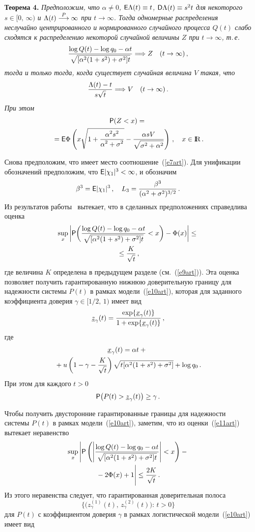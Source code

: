 \begin{multicols}{2}
\smallskip

\noindent
{\textbf{Теорема 4.}} {\it Предположим, что $\alpha\neq 0$, ${\sf
E}\Lambda(t) \equiv t$,  ${\sf D}\Lambda(t)\equiv s^2t$ для
некоторого $s\in[0,\, \infty)$ и $\Lambda(t)\stackrel{P}{\longrightarrow}\infty$ при $t\to\infty$.
Тогда одномерные распределения неслучайно центрированного и
нормированного случайного процесса $Q(t)$ слабо сходятся к
распределению некоторой случайной величины $Z$ при $t\to\infty$,
т.\,е.\
$$
\displaystyle\frac{\displaystyle \log Q(t)-\log q_0-\alpha
t\mathstrut}{\displaystyle \sqrt{[\alpha^2(1+s^2)+\sigma^2]t}\mathstrut}\Longrightarrow Z\ \ \
(t\to\infty)\,,
$$
тогда и только тогда, когда существует случайная величина $V$
такая, что
$$
\displaystyle\frac{\displaystyle \Lambda(t)-t\mathstrut}{\displaystyle s\sqrt t\mathstrut}\Longrightarrow V\ \ \ (t\to\infty)\,.
$$
При этом}
\begin{multline*}
{\sf P}(Z<x)={}\\
{}={\sf
E}\Phi\left(x\sqrt{1+\displaystyle\frac{\displaystyle \alpha^2s^2\mathstrut}{\displaystyle \alpha^2+\sigma^2\mathstrut}}-\displaystyle\frac{\displaystyle \alpha
sV\mathstrut}{\displaystyle \sqrt{\sigma^2+\alpha^2}\mathstrut}\right)\,,\ \ \ x\in{\rm I\hspace{-0.7mm}\rm R}\,.
\end{multline*}

\smallskip

Снова предположим, что имеет место соотношение~(\ref{e7art}). Для унификации
обозначений предположим, что ${\sf E}|\chi_1|^3<\infty$, и обозначим
$$
\beta^3 = {\sf E}|\chi_1|^3\,,\ \ \ L_3 =
\frac{\beta^3}{(\alpha^2+\sigma^2)^{3/2}}\,.
$$
Из результатов работы~\cite{10art} вытекает, что в сделанных
предположениях справедлива оценка
\begin{multline}
\sup_x\bigg|{\sf P}\bigg(\displaystyle\frac{\displaystyle \log Q(t)-\log q_0-\alpha
t\mathstrut}{\displaystyle \sqrt{[\alpha^2(1+s^2)+\sigma^2]t}\mathstrut}<x\bigg)-\Phi(x)\bigg|\le{}\\
{}\le \displaystyle\frac{\displaystyle K\mathstrut}{\displaystyle \sqrt{t}\mathstrut}\,,
\label{e11art}
\end{multline}
где величина $K$ определена в предыдущем разделе (см.~(\ref{e9art})). Эта
оценка позволяет получить гарантированную нижнюю доверительную
границу для надежности системы $P(t)$ в рамках модели~(\ref{e10art}),
которая для заданного коэффициента доверия $\gamma\in[1/2,\,1)$
имеет вид
$$
\underline z_{\gamma}(t)=\displaystyle\frac{\displaystyle \exp\{\underline
x_{\gamma}(t)\}\mathstrut}{\displaystyle 1+\exp\{\underline x_{\gamma}(t)\}\mathstrut}\,,
$$
где
\begin{multline*}
\!\underline x_{\gamma}(t)=\alpha t+{}\\
{}+ u\left (1-\gamma-\displaystyle\frac{\displaystyle K\mathstrut}{\displaystyle \sqrt{t}\mathstrut}\right )\sqrt{t[\alpha^2(1+s^2)+\sigma^2]}+\log q_0\,.
\end{multline*}
При этом для каждого $t>0$
$$
{\sf P}\big(P(t)>\underline z_{\gamma}(t)\big)\ge\gamma\,.
$$

Чтобы получить двусторонние гарантированные границы для надежности
системы $P(t)$ в рамках модели~(\ref{e10art}), заметим, что из оценки~(\ref{e11art})
вытекает неравенство
\begin{multline*}
\sup_x\Bigg|{\sf P}\left(\left|\displaystyle\frac{\displaystyle \log Q(t)-\log q_0-\alpha
t\mathstrut}{\displaystyle \sqrt{[\alpha^2(1+s^2)+\sigma^2]t}\mathstrut}\right|<x\right)-{}\\
{}-2\Phi(x)+1\Bigg|\le
\displaystyle\frac{\displaystyle 2K\mathstrut}{\displaystyle \sqrt{t}\mathstrut}\,.
\end{multline*}
Из этого неравенства следует, что гарантированная доверительная
полоса
$$
\big\{\big(z^{(1)}_{\gamma}(t),\,z^{(2)}_{\gamma}(t)\big):\,t>0\big\}
$$
для $P(t)$ с коэффициентом доверия $\gamma$ в рамках логистической
модели~(\ref{e10art}) имеет вид
\end{multicols}
